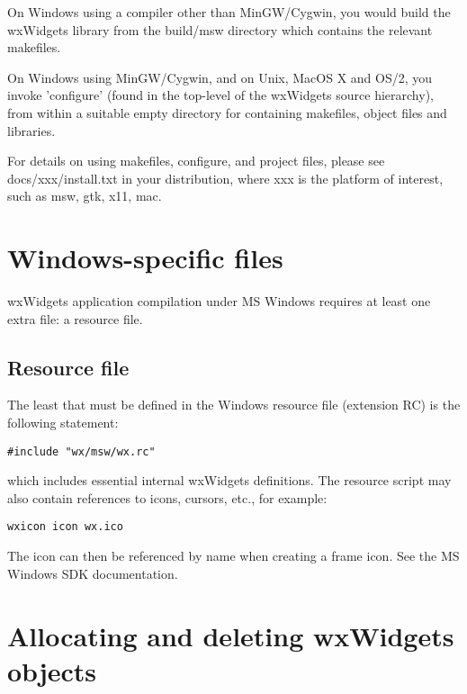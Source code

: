 On Windows using a compiler other than MinGW/Cygwin, you would
build the wxWidgets library from the build/msw directory
which contains the relevant makefiles.

On Windows using MinGW/Cygwin, and on Unix, MacOS X and OS/2, you invoke
'configure' (found in the top-level of the wxWidgets source hierarchy),
from within a suitable empty directory for containing makefiles, object files and
libraries.

For details on using makefiles, configure, and project files,
please see docs/xxx/install.txt in your distribution, where
xxx is the platform of interest, such as msw, gtk, x11, mac.

\section{Windows-specific files}\label{windowsfiles}

wxWidgets application compilation under MS Windows requires at least one
extra file: a resource file.

\subsection{Resource file}\label{resources}

The least that must be defined in the Windows resource file (extension RC)
is the following statement:

\begin{verbatim}
#include "wx/msw/wx.rc"
\end{verbatim}

which includes essential internal wxWidgets definitions.  The resource script
may also contain references to icons, cursors, etc., for example:

\begin{verbatim}
wxicon icon wx.ico
\end{verbatim}

The icon can then be referenced by name when creating a frame icon. See
the MS Windows SDK documentation.


\section{Allocating and deleting wxWidgets objects}\label{allocatingobjects}

